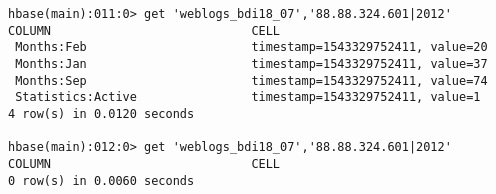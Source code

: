 \documentclass[a4paper,11pt]{report}
\begin{document}
\begin{verbatim}
hbase(main):011:0> get 'weblogs_bdi18_07','88.88.324.601|2012'
COLUMN                            CELL                                                                                          
 Months:Feb                       timestamp=1543329752411, value=20                                                             
 Months:Jan                       timestamp=1543329752411, value=37                                                             
 Months:Sep                       timestamp=1543329752411, value=74                                                             
 Statistics:Active                timestamp=1543329752411, value=1                                                              
4 row(s) in 0.0120 seconds

hbase(main):012:0> get 'weblogs_bdi18_07','88.88.324.601|2012'
COLUMN                            CELL                                                                                          
0 row(s) in 0.0060 seconds
\end{verbatim}
\end{document}
